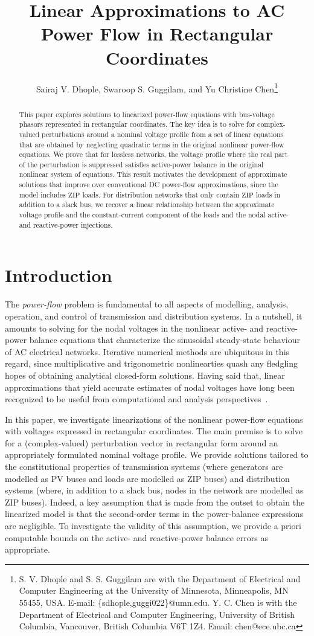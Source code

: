 \documentclass[10 pt, conference]{ieeeconf}
\title{Linear Approximations to AC Power Flow in Rectangular Coordinates}
\author{Sairaj V. Dhople, Swaroop S. Guggilam, and Yu Christine Chen\thanks{S. V. Dhople and S. S. Guggilam are with the Department of Electrical and Computer Engineering at the University of Minnesota, Minneapolis, MN 55455, USA. E-mail: \{sdhople,guggi022\}@umn.edu. 
Y. C. Chen is with the Department of Electrical and Computer Engineering, University of British Columbia, Vancouver, British Columbia V6T 1Z4. Email: chen@ece.ubc.ca}}
\begin{document}
\maketitle
\thispagestyle{empty}
\pagestyle{empty}

\begin{abstract}
This paper explores solutions to linearized power-flow equations with bus-voltage phasors represented in rectangular coordinates. The key idea is to solve for complex-valued perturbations around a nominal voltage profile from a set of linear equations that are obtained by neglecting quadratic terms in the original nonlinear power-flow equations. We prove that for lossless networks, the voltage profile where the real part of the perturbation is suppressed satisfies active-power balance in the original nonlinear system of equations. This result motivates the development of approximate solutions that improve over conventional DC power-flow approximations, since the model includes $\mathrm{ZIP}$ loads. For distribution networks that only contain $\mathrm{ZIP}$ loads in addition to a slack bus, we recover a linear relationship between the approximate voltage profile and the constant-current component of the loads and the nodal active- and reactive-power injections.  
\end{abstract}

\section{Introduction}
The \emph{power-flow} problem is fundamental to all aspects of modelling, analysis, operation, and control of transmission and distribution systems. In a nutshell, it amounts to solving for the nodal voltages in the nonlinear active- and reactive-power balance equations that characterize the sinusoidal steady-state behaviour of AC electrical networks.  Iterative numerical methods are ubiquitous in this regard, since multiplicative and trigonometric nonlinearties quash any fledgling hopes of obtaining analytical closed-form solutions. Having said that, linear approximations that yield accurate estimates of nodal voltages have long been recognized to be useful from computational and analysis perspectives~\cite{Stott-2009,Saverio-2015}.

In this paper, we investigate linearizations of the nonlinear power-flow equations with voltages expressed in rectangular coordinates. The main premise is to solve for a (complex-valued) perturbation vector in rectangular form around an appropriately formulated nominal voltage profile. We provide solutions tailored to the constitutional properties of transmission systems (where generators are modelled as $\mathrm{PV}$ buses and loads are modelled as $\mathrm{ZIP}$ buses) and distribution systems (where, in addition to a slack bus, nodes in the network are modelled as $\mathrm{ZIP}$ buses). Indeed, a key assumption that is made from the outset to obtain the linearized model is that the second-order terms in the power-balance expressions are negligible. To investigate the validity of this assumption, we provide a priori computable bounds on the active- and reactive-power balance errors as appropriate. 
\end{document}
